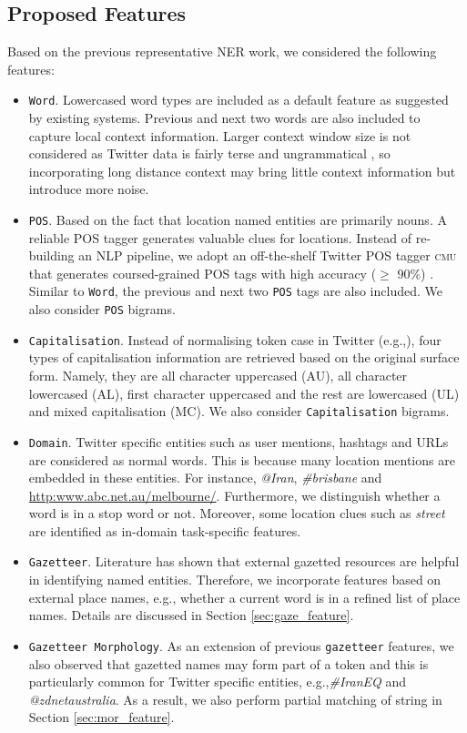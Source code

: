 \documentclass[11pt]{article}
\newcommand{\eg}{e.g.,\xspace}
\newcommand{\myex}[1]{\textit{#1}}
\newcommand{\cmu}{\textsc{cmu}\xspace}
\newcommand{\feature}[1]{\texttt{#1}\xspace}
\newcommand{\myurl}[1]{{\footnotesize\url{#1}}}
\newcommand{\secref}[2][]{Section#1 \ref{#2}}
\begin{document}
\subsection{Proposed Features}
\label{sec:basic_feature}

Based on the previous representative NER work, we considered the following features:

\begin{itemize}
    \item \feature{Word}. Lowercased word types are included as a default feature as suggested by existing systems. Previous and next two words are also included to capture local context information. Larger context window size is not considered as Twitter data is fairly terse and ungrammatical \cite{baldwin2013}, so incorporating long distance context may bring little context information but introduce more noise.
    \item \feature{POS}. Based on the fact that location named entities are primarily nouns. A reliable POS tagger generates valuable clues for locations. Instead of re-building an NLP pipeline, we adopt an off-the-shelf Twitter POS tagger \cmu that generates coursed-grained POS tags with high accuracy ($\ge$ 90\%) \cite{naacl13owop}. Similar to \feature{Word}, the previous and next two \feature{POS} tags are also included. We also consider \feature{POS} bigrams.
    \item \feature{Capitalisation}. Instead of normalising token case in Twitter (\eg \cite{emnlp11ritt}), four types of capitalisation information are retrieved based on the original surface form. Namely, they are all character uppercased (AU), all character lowercased (AL), first character uppercased and the rest are lowercased (UL) and mixed capitalisation (MC). We also consider \feature{Capitalisation} bigrams.
    \item \feature{Domain}. Twitter specific entities such as user mentions, hashtags and URLs are considered as normal words. This is because many location mentions are embedded in these entities. For instance, \myex{@Iran}, \myex{\#brisbane} and \myurl{http:www.abc.net.au/melbourne/}. Furthermore, we distinguish whether a word is in a stop word or not. Moreover, some location clues such as \myex{street} are identified as in-domain task-specific features.
    \item \feature{Gazetteer}. Literature has shown that external gazetted resources are helpful in identifying named entities. Therefore, we incorporate features based on external place names, \eg whether a current word is in a refined list of place names. Details are discussed in \secref{sec:gaze_feature}.
    \item \feature{Gazetteer Morphology}. As an extension of previous \feature{gazetteer} features, we also observed that gazetted names may form part of a token and this is particularly common for Twitter specific entities, \eg \myex{\#IranEQ} and \myex{@zdnetaustralia}. As a result, we also perform partial matching of string in \secref{sec:mor_feature}. 
\end{itemize}
\end{document}
